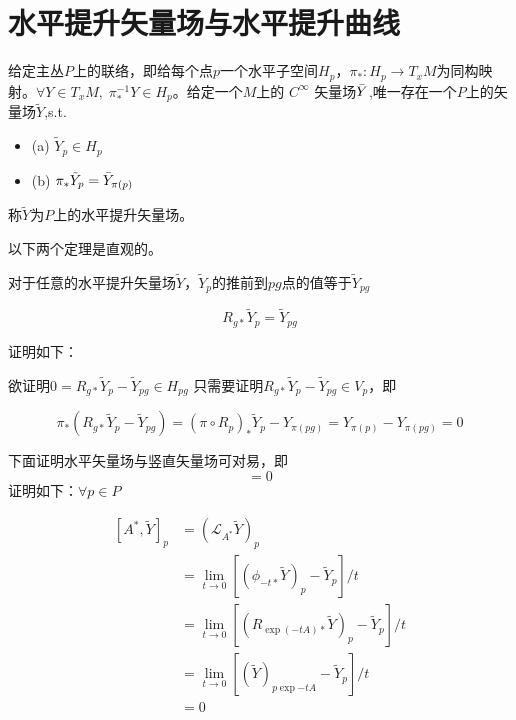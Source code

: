 \documentclass{ctexbook}
\begin{document}
\section{水平提升矢量场与水平提升曲线}

给定主丛$P$上的联络，即给每个点$p$一个水平子空间$H_p$，$\pi_{*}\colon H_p\to T_x M$为同构映射。$\forall Y\in T_x M,\;\pi^{-1}_{*}Y\in H_p$。给定一个$M$上的 $C^{\infty}$ 矢量场$\Bar{Y}$,唯一存在一个$P$上的矢量场$\tilde{Y}$,s.t.
\begin{itemize}
    \item (a) $\tilde{Y}_p\in H_p$
    \item (b) $\pi_{*}\tilde{Y}_p=\Bar{Y}_{\pi(p)}$
\end{itemize}
称$\tilde{Y}$为$P$上的水平提升矢量场。

以下两个定理是直观的。

对于任意的水平提升矢量场$\tilde{Y}$，$\tilde{Y}_p$的推前到$pg$点的值等于$\tilde{Y}_{pg}$

\begin{equation}
    R_{g*}\tilde{Y}_p=\tilde{Y}_{pg}
\end{equation}

证明如下：

欲证明$0=R_{g*}\tilde{Y}_p-\tilde{Y}_{pg}\in H_{pg}$ 只需要证明$R_{g*}\tilde{Y}_p-\tilde{Y}_{pg}\in V_p$，即

\begin{equation}
    \pi_{*}\left(R_{g*}\tilde{Y}_p-\tilde{Y}_{pg}\right)=\left(\pi\circ R_p\right)_{*}\tilde{Y}_p-Y_{\pi(pg)}=Y_{\pi(p)}-Y_{\pi(pg)}=0
\end{equation}

下面证明水平矢量场与竖直矢量场可对易，即
\begin{equation}
    [A^{*},\tilde{Y}]=0
\end{equation}
证明如下：$\forall p\in P$

\begin{equation}
    \begin{split}
        [A^{*},\tilde{Y}]_{p}
        &=\left(\mathscr{L}_{A^*}\tilde{Y}\right)_p\\
        &=\lim_{t\to0}{\left[\left(\phi_{-t*}\tilde{Y}\right)_p-\tilde{Y}_p\right]/t}\\
        &=\lim_{t\to0}{\left[\left(R_{\exp{(-t A)}*}\tilde{Y}\right)_p-\tilde{Y}_p\right]/t}\\
        &=\lim_{t\to0}{\left[\left(\tilde{Y}\right)_{p\exp{-tA}}-\tilde{Y}_p\right]/t}\\
        &=0\\
    \end{split}
\end{equation}
\end{document}
